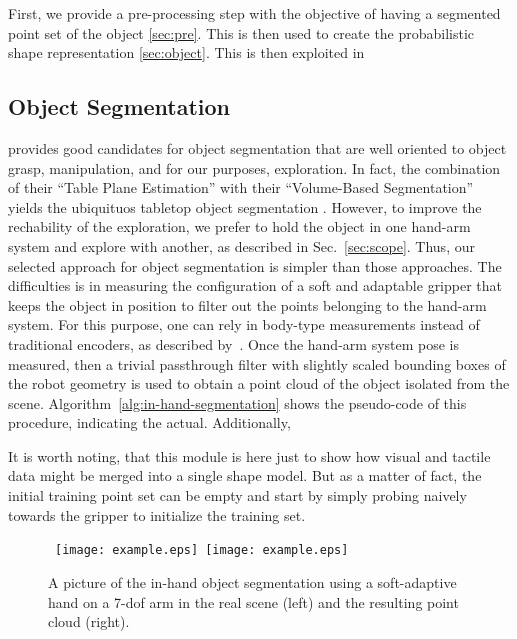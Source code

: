 First, we provide a pre-processing step with the objective of having a segmented point set of the object \ref{sec:pre}. This is then used to create the probabilistic shape representation \ref{sec:object}. This is then exploited in 

\subsection{Object Segmentation}
\label{sec:segmentation}

\citep[Sec.~III.A]{Hudson2012Endtoend} provides good candidates for object segmentation that are well oriented to object grasp, manipulation, and for our purposes, exploration. In fact, the combination of their ``Table Plane Estimation'' with their ``Volume-Based Segmentation'' yields the ubiquituos tabletop object segmentation \citep{TabletopObjectDetector}. However, to improve the rechability of the exploration, we prefer to hold the object in one hand-arm system and explore with another, as described in Sec.~\ref{sec:scope}. Thus, our selected approach for object segmentation is simpler than those approaches. The difficulties is in measuring the configuration of a soft and adaptable gripper that keeps the object in position to filter out the points belonging to the hand-arm system. For this purpose, one can rely in body-type measurements instead of traditional encoders, as described by~\citet{Santaera2015Lowcost}. Once the hand-arm system pose is measured, then a trivial passthrough filter with slightly scaled bounding boxes of the robot geometry is used to obtain a point cloud of the object isolated from the scene. Algorithm~\ref{alg:in-hand-segmentation} shows the pseudo-code of this procedure, indicating the actual. Additionally, 

It is worth noting, that this module is here just to show how visual and tactile data might be merged into a single shape model. But as a matter of fact, the initial training point set can be empty and start by simply probing naively towards the gripper to initialize the training set.

\begin{figure}
\centering
  \mbox{
  \texttt{[image: example.eps]}
  \texttt{[image: example.eps]}
  }
  \caption{A picture of the in-hand object segmentation using a soft-adaptive hand on a 7-dof arm in the real scene (left) and the resulting point cloud (right).} \label{fig:in-hand-segmentation}
\end{figure}

